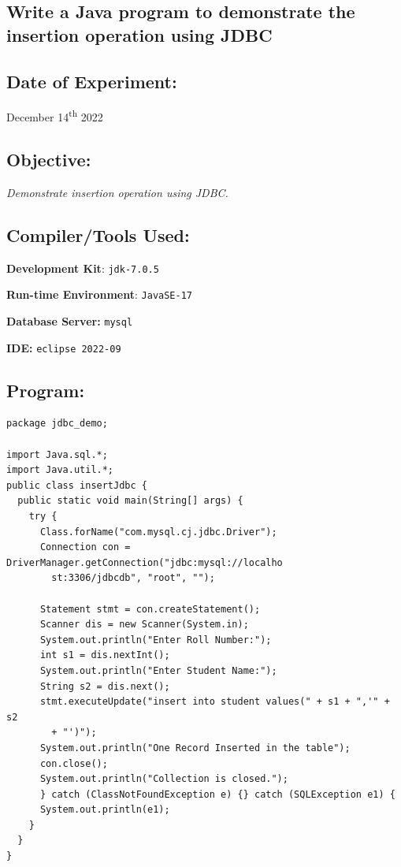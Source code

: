\documentclass[12pt, a4paper]{article}
\begin{document}
\begin{tcolorbox}
  \section{Write a Java program to demonstrate the insertion operation using JDBC}
\end{tcolorbox}
\subsection*{Date of Experiment:}
December 14\textsuperscript{th} 2022

\subsection*{Objective:}
\emph{\large{Demonstrate insertion operation using JDBC.}}

\subsection*{Compiler/Tools Used:}
\textbf{Development Kit}: \verb+jdk-7.0.5+

\textbf{Run-time Environment}: \verb+JavaSE-17+

\textbf{Database Server:} \verb+mysql+

\textbf{IDE:} \verb+eclipse 2022-09+

\subsection*{Program:}
\begin{lstlisting}
package jdbc_demo;

import Java.sql.*;
import Java.util.*;
public class insertJdbc {
  public static void main(String[] args) {
    try {
      Class.forName("com.mysql.cj.jdbc.Driver");
      Connection con = DriverManager.getConnection("jdbc:mysql://localho
        st:3306/jdbcdb", "root", "");

      Statement stmt = con.createStatement();
      Scanner dis = new Scanner(System.in);
      System.out.println("Enter Roll Number:");
      int s1 = dis.nextInt();
      System.out.println("Enter Student Name:");
      String s2 = dis.next();
      stmt.executeUpdate("insert into student values(" + s1 + ",'" + s2
        + "')");
      System.out.println("One Record Inserted in the table");
      con.close();
      System.out.println("Collection is closed.");
      } catch (ClassNotFoundException e) {} catch (SQLException e1) {
      System.out.println(e1);
    }
  }
}
\end{lstlisting}
\end{document}
